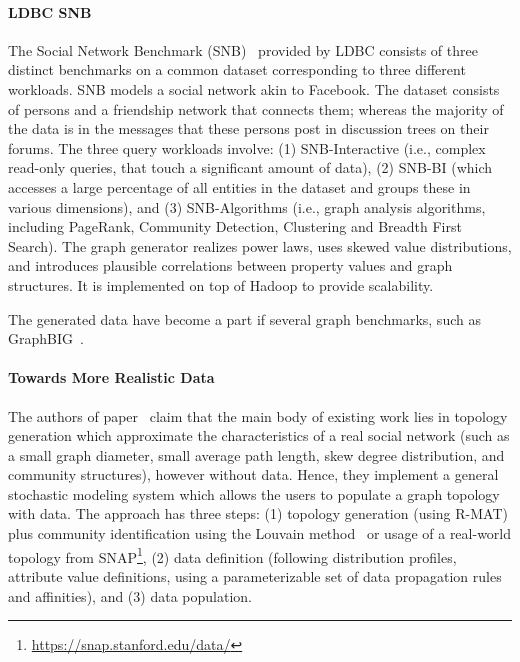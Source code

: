 \paragraph{LDBC SNB} The Social Network Benchmark
(SNB)~\cite{Erling:2015:LSN:2723372.2742786} provided by LDBC consists of three
distinct benchmarks on a common dataset corresponding to three different
workloads. SNB models a social network akin to Facebook. The dataset consists of
persons and a friendship network that connects them; whereas the majority of the
data is in the messages that these persons post in discussion trees on their
forums. The three query workloads involve: (1) SNB-Interactive (i.e., complex
read-only queries, that touch a significant amount of data), (2) SNB-BI (which
accesses a large percentage of all entities in the dataset and groups these in
various dimensions), and (3) SNB-Algorithms (i.e., graph analysis algorithms,
including PageRank, Community Detection, Clustering and Breadth First Search).
The graph generator realizes power laws, uses skewed value distributions, and
introduces plausible correlations between property values and graph structures.
It is implemented on top of Hadoop to provide scalability.

The generated data have become a part if several graph benchmarks, such as
GraphBIG~\cite{Nai:2015:GUG:2807591.2807626}.

\paragraph{Towards More Realistic Data} The authors of
paper~\cite{Nettleton2016} claim that the main body of existing work lies in
topology generation which approximate the characteristics of a real social
network (such as a small graph diameter, small average path length, skew degree
distribution, and community structures), however without data. Hence, they
implement a general stochastic modeling system which allows the users to
populate a graph topology with data. The approach has three steps: (1) topology
generation (using R-MAT) plus community identification using the Louvain
method~\cite{1742-5468-2008-10-P10008} or usage of a real-world topology from
SNAP\footnote{\url{https://snap.stanford.edu/data/}}, (2) data definition
(following distribution profiles, attribute value definitions, using a
parameterizable set of data propagation rules and affinities), and (3) data
population.


